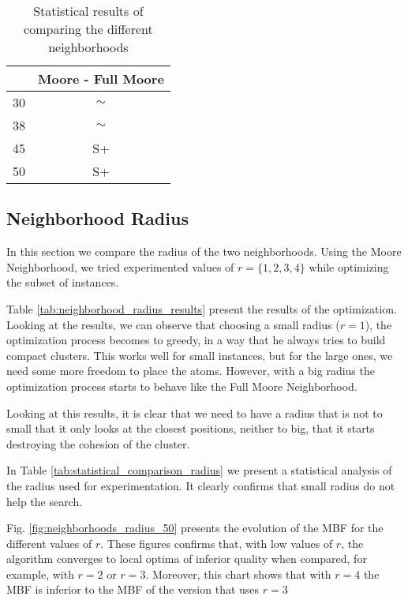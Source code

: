 		\begin{table}[!htdp]
				\begin{center}
					\begin{tabular}{| c | c |}
						\hline
						~ & \textbf{Moore - Full Moore} \\ \hline
						30 & $\sim$ \\ \hline
						38 & $\sim$ \\ \hline
						45 & S+ \\ \hline
						50 & S+ \\ \hline
					\end{tabular}
					\caption{Statistical results of comparing the different neighborhoods}
					\label{tab:statistical_comparison_neighborhoods}
				\end{center}
		\end{table}
		
		\pagebreak
		\subsection{Neighborhood Radius}
		
		In this section we compare the radius of the two neighborhoods. Using the Moore Neighborhood, we tried experimented values of $r = \{1, 2, 3, 4\}$ while optimizing the subset of instances.
		
		Table \ref{tab:neighborhood_radius_results} present the results of the optimization. Looking at the results, we can observe that choosing a small radius ($r=1$), the optimization process becomes to greedy, in a way that he always tries to build compact clusters. This works well for small instances, but for the large ones, we need some more freedom to place the atoms. However, with a big radius the optimization process starts to behave like the Full Moore Neighborhood. 
		
		Looking at this results, it is clear that we need to have a radius that is not to small that it only looks at the closest positions, neither to big, that it starts destroying the cohesion of the cluster.
		
		In Table \ref{tab:statistical_comparison_radius} we present a statistical analysis of the radius used for experimentation. It clearly confirms that small radius do not help the search.
		
		Fig. \ref{fig:neighborhoods_radius_50} presents the evolution of the MBF for the different values of $r$. These figures confirms that, with low values of $r$, the algorithm converges to local optima of inferior quality when compared, for example, with $r=2$ or $r=3$. Moreover, this chart shows that with $r=4$ the MBF is inferior to the MBF of the version that uses $r=3$
		
